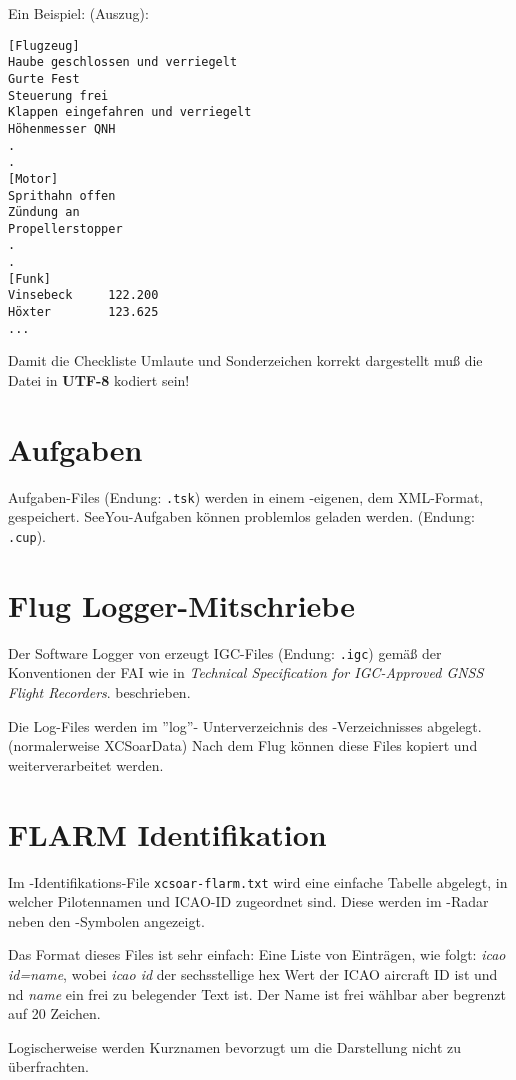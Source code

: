 Ein Beispiel: (Auszug):
\begin{verbatim}
[Flugzeug]
Haube geschlossen und verriegelt
Gurte Fest
Steuerung frei
Klappen eingefahren und verriegelt
Höhenmesser QNH
.
.
[Motor]
Sprithahn offen
Zündung an
Propellerstopper 
.
.
[Funk]
Vinsebeck     122.200
Höxter        123.625
...
\end{verbatim}
Damit die Checkliste Umlaute und Sonderzeichen korrekt dargestellt muß die Datei \warning 
in \textbf{UTF-8} kodiert sein!


\section{Aufgaben }

Aufgaben-Files  (Endung: \verb|.tsk|) werden in einem \xc -eigenen, dem  XML-Format, gespeichert.
SeeYou-Aufgaben können problemlos geladen werden. (Endung: \verb|.cup|).


\section{Flug Logger-Mitschriebe} \label{sec:logfiles}
Der Software Logger von \xc erzeugt  IGC-Files (Endung: \verb|.igc|)
gemäß der Konventionen der FAI wie in  {\em Technical Specification for IGC-Approved GNSS Flight Recorders}.
beschrieben.

Die Log-Files werden  im ''log''- Unterverzeichnis des \xc -Verzeichnisses abgelegt. (normalerweise XCSoarData)
Nach dem Flug können diese Files kopiert und weiterverarbeitet werden.


\section{FLARM Identifikation}\label{sec:flarm-ident-file}

Im  \fl-Identifikations-File  \verb|xcsoar-flarm.txt| wird eine einfache Tabelle
abgelegt, in welcher Pilotennamen und ICAO-ID zugeordnet sind.
Diese werden im \fl-Radar neben den \fl-Symbolen angezeigt.

Das Format dieses Files ist sehr einfach: Eine Liste von Einträgen, wie folgt:
{\em icao id=name}, wobei {\em icao id} der sechsstellige hex Wert der ICAO
aircraft ID ist und  nd {\em name} ein frei zu belegender Text ist.
Der Name ist frei wählbar aber  begrenzt auf 20 Zeichen.

Logischerweise werden Kurznamen bevorzugt um die Darstellung nicht zu überfrachten.

